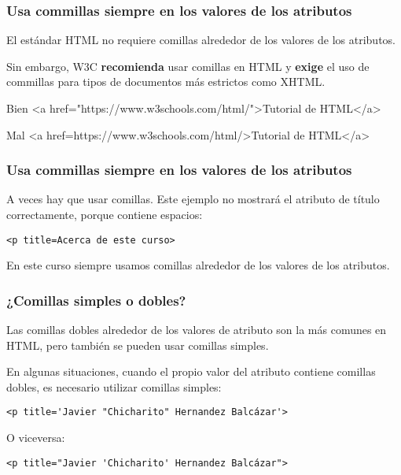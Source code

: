 \begin{frame}[fragile]
  \frametitle{Usa commillas siempre en los valores de los atributos}

  El estándar HTML no requiere comillas alrededor de los valores de
  los atributos.

  \vspace{\baselineskip}
  Sin embargo, W3C \textbf{recomienda} usar comillas en HTML y
  \textbf{exige} el uso de commillas para tipos de documentos más
  estrictos como XHTML.

  \vspace{\baselineskip}
  \begin{exampleblock}{Bien}
<a href="https://www.w3schools.com/html/">Tutorial de HTML</a>
  \end{exampleblock}

  \begin{alertblock}{Mal}
<a href=https://www.w3schools.com/html/>Tutorial de HTML</a>
  \end{alertblock}
\end{frame}

\begin{frame}[fragile]
  \frametitle{Usa commillas siempre en los valores de los atributos}

  A veces hay que usar comillas. Este ejemplo no mostrará el atributo
  de título correctamente, porque contiene espacios:

  \vspace{\baselineskip}
  \begin{lstlisting}
<p title=Acerca de este curso>
  \end{lstlisting}

  \vspace{\baselineskip}
  \begin{block}{}
    En este curso siempre usamos comillas alrededor de los valores de
    los atributos.
  \end{block}
\end{frame}

\begin{frame}[fragile]
  \frametitle{¿Comillas simples o dobles?}

  Las comillas dobles alrededor de los valores de atributo son la
  más comunes en HTML, pero también se pueden usar comillas simples.

  \vspace{\baselineskip}
  En algunas situaciones, cuando el propio valor del atributo
  contiene comillas dobles, es necesario utilizar comillas simples:

  \vspace{\baselineskip}
  \begin{lstlisting}
<p title='Javier "Chicharito" Hernandez Balcázar'>
  \end{lstlisting}

  \vspace{\baselineskip}
  O viceversa:

  \vspace{\baselineskip}
  \begin{lstlisting}
<p title="Javier 'Chicharito' Hernandez Balcázar">
  \end{lstlisting}
\end{frame}

